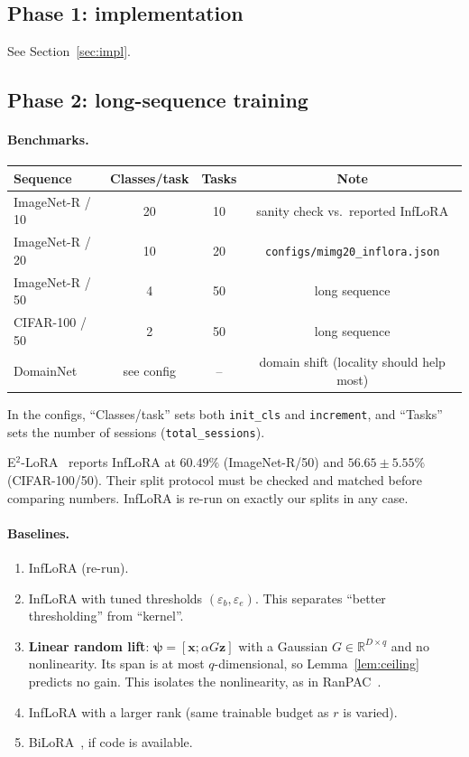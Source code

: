 \documentclass[11pt]{article}
\theoremstyle{plain}
\theoremstyle{definition}
\theoremstyle{remark}
\newcommand{\R}{\mathbb{R}}
\newcommand{\x}{\bm{x}}
\newcommand{\z}{\bm{z}}
\newcommand{\vpsi}{\bm{\psi}}
\newcommand{\code}[1]{\texttt{#1}}
\begin{document}
\subsection{Phase 1: implementation}
See Section~\ref{sec:impl}.

\subsection{Phase 2: long-sequence training}
\paragraph{Benchmarks.}
\begin{center}
\begin{tabular}{@{}lccc@{}}
\toprule
Sequence & Classes/task & Tasks & Note\\
\midrule
ImageNet-R / 10 & 20 & 10 & sanity check vs.\ reported InfLoRA\\
ImageNet-R / 20 & 10 & 20 & \code{configs/mimg20\_inflora.json}\\
ImageNet-R / 50 & 4 & 50 & long sequence\\
CIFAR-100 / 50 & 2 & 50 & long sequence\\
DomainNet & see config & -- & domain shift (locality should help most)\\
\bottomrule
\end{tabular}
\end{center}
In the configs, ``Classes/task'' sets both \code{init\_cls} and \code{increment}, and ``Tasks'' sets the number of sessions (\code{total\_sessions}).

E$^2$-LoRA~\cite{e2lora} reports InfLoRA at $60.49\%$ (ImageNet-R/50) and $56.65\pm5.55\%$ (CIFAR-100/50). Their split protocol must be checked and matched before comparing numbers. InfLoRA is re-run on exactly our splits in any case.

\paragraph{Baselines.}
\begin{enumerate}[nosep]
\item InfLoRA (re-run).
\item InfLoRA with tuned thresholds $(\varepsilon_b,\varepsilon_e)$. This separates ``better thresholding'' from ``kernel''.
\item \textbf{Linear random lift}: $\vpsi=[\x;\alpha G\z]$ with a Gaussian $G\in\R^{D\times q}$ and no nonlinearity. Its span is at most $q$-dimensional, so Lemma~\ref{lem:ceiling} predicts no gain. This isolates the nonlinearity, as in RanPAC~\cite{ranpac}.
\item InfLoRA with a larger rank (same trainable budget as $r$ is varied).
\item BiLoRA~\cite{bilora}, if code is available.
\end{enumerate}
\end{document}
